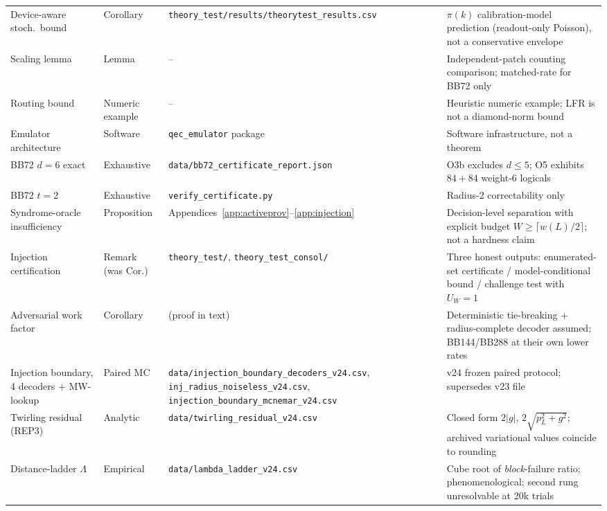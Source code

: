 \documentclass[11pt,a4paper]{article}
\begin{document}
\begin{longtable}{@{}>{\raggedright\arraybackslash}p{3.4cm}>{\raggedright\arraybackslash}p{1.6cm}>{\raggedright\arraybackslash}p{4.6cm}>{\raggedright\arraybackslash}p{4.4cm}@{}}
Device-aware stoch.\ bound & Corollary & \texttt{theory\_\allowbreak test/\allowbreak results/\allowbreak theorytest\_\allowbreak results.csv} & $\pi(k)$ calibration-model prediction (readout-only Poisson), not a conservative envelope \\
Scaling lemma & Lemma & -- & Independent-patch counting comparison; matched-rate for BB72 only \\
Routing bound & Numeric example & -- & Heuristic numeric example; LFR is not a diamond-norm bound \\
Emulator architecture & Software & \texttt{qec\_\allowbreak emulator} package & Software infrastructure, not a theorem \\
BB72 $d=6$ exact & Exhaustive & \texttt{data/\allowbreak bb72\_\allowbreak certificate\_\allowbreak report.json} & O3b excludes $d\le5$; O5 exhibits $84+84$ weight-6 logicals \\
BB72 $t=2$ & Exhaustive & \texttt{verify\_\allowbreak certificate.py} & Radius-2 correctability only \\
Syndrome-oracle insufficiency & Proposition & Appendices~\ref{app:activeprov}--\ref{app:injection} & Decision-level separation with explicit budget $W\ge\lceil w(L)/2\rceil$; not a hardness claim \\
Injection certification & Remark (was Cor.) & \texttt{theory\_\allowbreak test/\allowbreak }, \texttt{theory\_\allowbreak test\_\allowbreak consol/\allowbreak } & Three honest outputs: enumerated-set certificate / model-conditional bound / challenge test with $U_W=1$ \\
Adversarial work factor & Corollary & (proof in text) & Deterministic tie-breaking + radius-complete decoder assumed; BB144/BB288 at their own lower rates \\
Injection boundary, 4 decoders + MW-lookup & Paired MC & \texttt{data/\allowbreak injection\_\allowbreak boundary\_\allowbreak decoders\_\allowbreak v24.csv}, \texttt{inj\_\allowbreak radius\_\allowbreak noiseless\_\allowbreak v24.csv}, \texttt{injection\_\allowbreak boundary\_\allowbreak mcnemar\_\allowbreak v24.csv} & v24 frozen paired protocol; supersedes v23 file \\
Twirling residual (REP3) & Analytic & \texttt{data/\allowbreak twirling\_\allowbreak residual\_\allowbreak v24.csv} & Closed form $2|g|$, $2\sqrt{p_L^2+g^2}$; archived variational values coincide to rounding \\
Distance-ladder $\Lambda$ & Empirical & \texttt{data/\allowbreak lambda\_\allowbreak ladder\_\allowbreak v24.csv} & Cube root of \emph{block}-failure ratio; phenomenological; second rung unresolvable at 20k trials \\

\end{longtable}
\end{document}
